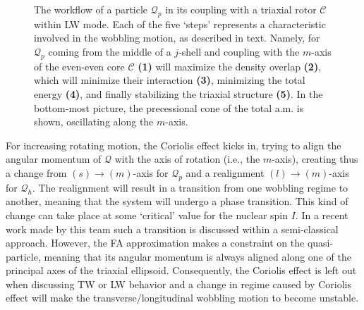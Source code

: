 \begin{figure}
\begin{tikzpicture}[every text node part/.style={align=center}]
    \end{tikzpicture}
    
    \caption{The workflow of a particle $\mathcal{Q}_p$ in its coupling with a triaxial rotor $\mathscr{C}$ within LW mode. Each of the five `steps' represents a characteristic involved in the wobbling motion, as described in text. Namely, for $\mathcal{Q}_p$ coming from the middle of a $j$-shell and coupling with the $m$-axis of the even-even core $\mathscr{C}$ \textbf{(1)} will maximize the density overlap \textbf{(2)}, which will minimize their interaction \textbf{(3)}, minimizing the total energy \textbf{(4)}, and finally stabilizing the triaxial structure \textbf{(5)}. In the bottom-most picture, the precessional cone of the total a.m. is shown, oscillating along the $m$-axis.}
    \label{advanced-quasiparticle-coupling-3}
\end{figure}

For increasing rotating motion, the Coriolis effect kicks in, trying to align the angular momentum of $\mathcal{Q}$ with the axis of rotation (i.e., the $m$-axis), creating thus a change from $(s)\to (m)$-axis for $\mathcal{Q}_p$ and a realignment $(l) \to (m)$-axis for $\mathcal{Q}_h$. The realignment will result in a transition from one wobbling regime to another, meaning that the system will undergo a phase transition. This kind of change can take place at some `critical' value for the nuclear spin $I$. In a recent work made by this team \cite{poenaru2021extensive1,poenaru2021extensive2} such a transition is discussed within a semi-classical approach. However, the FA approximation makes a constraint on the quasi-particle, meaning that its angular momentum is always aligned along one of the principal axes of the triaxial ellipsoid. Consequently, the Coriolis effect is left out when discussing TW or LW behavior and a change in regime caused by Coriolis effect will make the transverse/longitudinal wobbling motion to become unstable.

